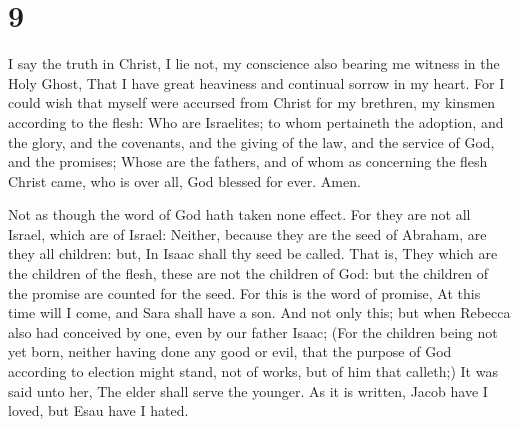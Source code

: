 \hypertarget{section-8}{%
\section{9}\label{section-8}}

 I say the truth in Christ, I lie not, my conscience also
bearing me witness in the Holy Ghost,  That I have great
heaviness and continual sorrow in my heart.  For I could
wish that myself were accursed from Christ for my brethren, my kinsmen
according to the flesh:  Who are Israelites; to whom
pertaineth the adoption, and the glory, and the covenants, and the
giving of the law, and the service of God, and the promises;
 Whose are the fathers, and of whom as concerning the flesh
Christ came, who is over all, God blessed for ever. Amen.

 Not as though the word of God hath taken none effect. For
they are not all Israel, which are of Israel:  Neither,
because they are the seed of Abraham, are they all children: but, In
Isaac shall thy seed be called.  That is, They which are the
children of the flesh, these are not the children of God: but the
children of the promise are counted for the seed.  For this
is the word of promise, At this time will I come, and Sara shall have a
son.  And not only this; but when Rebecca also had
conceived by one, even by our father Isaac;  (For the
children being not yet born, neither having done any good or evil, that
the purpose of God according to election might stand, not of works, but
of him that calleth;)  It was said unto her, The elder
shall serve the younger.  As it is written, Jacob have I
loved, but Esau have I hated.

